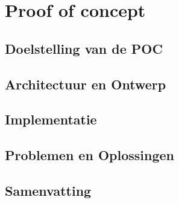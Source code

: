 \chapter{Proof of concept}
\label{ch:proof-of-concept}

\section{Doelstelling van de POC}



\section{Architectuur en Ontwerp}




\section{Implementatie}




\section{Problemen en Oplossingen}



\section{Samenvatting}


